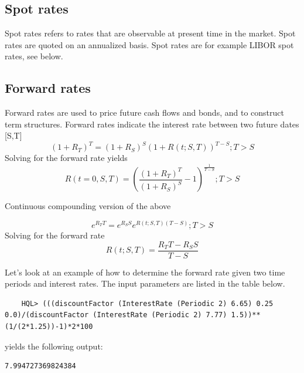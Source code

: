 \documentclass[11pt,a4paper]{article}
\numberwithin{equation}{section}
\begin{document}

	\subsection{Spot rates}
	Spot rates refers to rates that are observable at present time in the market.
	Spot rates are quoted on an annualized basis. Spot rates are for example LIBOR spot rates, see below.

	\subsection{Forward rates}
	Forward rates are used to price future cash flows and bonds, and to construct term structures. Forward rates indicate the interest rate between two future dates [S,T]
	\[
	(1+R_T)^T=(1+R_S)^S(1+R(t;S,T))^{T-S}; T>S
	\]
	Solving for the forward rate yields
	\[
	R(t=0,S,T)=\left( \frac{(1+R_T)^T}{(1+R_S)^S} - 1 \right)^{\frac{1}{T-S}};T>S
	\]

	Continuous compounding version of the above

	\[
	e^{R_TT}=e^{R_SS}e^{R(t;S,T)(T-S)};T>S
	\]
	Solving for the forward rate
	\[
	R(t;S,T)=\frac{R_TT-R_SS}{T-S}
	\]

	Let's look at an example of how to determine the forward rate given two time periods and interest rates. The input parameters are listed in the table below.


	\FrameSep
	\begin{lstlisting}
	HQL> (((discountFactor (InterestRate (Periodic 2) 6.65) 0.25 0.0)/(discountFactor (InterestRate (Periodic 2) 7.77) 1.5))**(1/(2*1.25))-1)*2*100
	\end{lstlisting}
	yields the following output:
	\FrameSep
	\begin{lstlisting}[style=Output]
	7.994727369824384
	\end{lstlisting}
\end{document}
